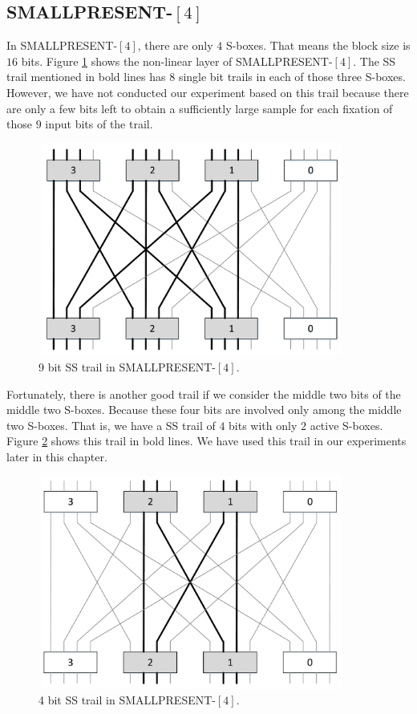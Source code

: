 \subsection{SMALLPRESENT-$[4]$}
In SMALLPRESENT-$[4]$, there are only $4$ S-boxes. That means the block size is $16$ bits.  Figure \ref{fig:smallpresent_4_player_9bit_trail} shows the non-linear layer of SMALLPRESENT-$[4]$. The SS trail mentioned in bold lines has $8$ single bit trails in each of those three S-boxes. However, we have not conducted our experiment based on this trail because there are only a few bits left to obtain a sufficiently large sample for each fixation of those $9$ input bits of the trail. 
\begin{figure}[h!]
    \centering
    \includegraphics[width=0.9\textwidth,height = 7cm]{images/SMALLPRESENT-4_9bit_trail}
    \caption{9 bit SS trail in SMALLPRESENT-$[4]$.}
    \label{fig:smallpresent_4_player_9bit_trail}
\end{figure}
Fortunately, there is another good trail if we consider the middle two bits of the middle two S-boxes. Because these four bits are involved only among the middle two S-boxes. That is, we have a SS trail of $4$ bits with only $2$ active S-boxes. Figure \ref{fig:smallpresent_4_player_4bit_trail} shows this trail in bold lines. We have used this trail in our experiments later in this chapter.
\begin{figure}[h!]
    \centering
    \includegraphics[width=0.9\textwidth,height = 7cm]{images/SMALLPRESENT-4_4bit_trail}
    \caption{4 bit SS trail in SMALLPRESENT-$[4]$.}
    \label{fig:smallpresent_4_player_4bit_trail}
\end{figure}

